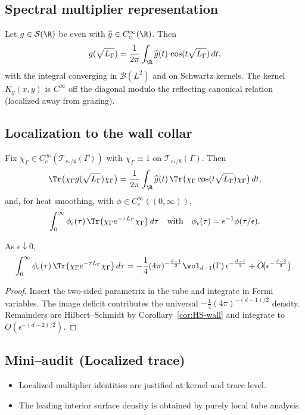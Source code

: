 \subsection{Spectral multiplier representation}
Let $g\in\mathcal S(\R)$ be even with $\widehat g\in C_c^\infty(\R)$. Then
\[
g(\sqrt{L_\Gamma})
=\frac{1}{2\pi}\int_{\R} \widehat g(t)\,\cos(t\sqrt{L_\Gamma})\,dt,
\]
with the integral converging in $\mathcal B(L^2)$ and on Schwartz kernels. The kernel $K_g(x,y)$ is $C^\infty$ off the diagonal modulo the reflecting canonical relation (localized away from grazing).

\subsection{Localization to the wall collar}
Fix $\chi_\Gamma\in C_c^\infty(\mathcal T_{r_*/4}(\Gamma))$ with $\chi_\Gamma\equiv1$ on $\mathcal T_{r_*/8}(\Gamma)$. Then
\[
\Tr\big(\chi_\Gamma g(\sqrt{L_\Gamma})\chi_\Gamma\big)
=\frac{1}{2\pi}\int_{\R}\widehat g(t)\,\Tr\big(\chi_\Gamma \cos(t\sqrt{L_\Gamma})\chi_\Gamma\big)\,dt,
\]
and, for heat smoothing, with $\phi\in C_c^\infty((0,\infty))$,
\[
\int_0^\infty \phi_\epsilon(\tau)\,\Tr\big(\chi_\Gamma e^{-\tau L_\Gamma}\chi_\Gamma\big)\,d\tau
\quad \text{with}\quad \phi_\epsilon(\tau)=\epsilon^{-1}\phi(\tau/\epsilon).
\]

\begin{proposition}
\label{prop:abelian-collar-strong}
As $\epsilon\downarrow0$,
\[
\int_0^\infty \phi_\epsilon(\tau)\,\Tr\big(\chi_\Gamma e^{-\tau L_\Gamma}\chi_\Gamma\big)\,d\tau
= -\frac14(4\pi)^{-\frac{d-1}{2}}\vol_{d-1}(\Gamma)\,\epsilon^{-\frac{d-1}{2}}
+O\!\big(\epsilon^{-\frac{d-2}{2}}\big).
\]
\end{proposition}

\begin{proof}
Insert the two-sided parametrix in the tube and integrate in Fermi variables. The image deficit contributes the universal $-\frac14(4\pi)^{-(d-1)/2}$ density. Remainders are Hilbert–Schmidt by Corollary~\ref{cor:HS-wall} and integrate to $O(\epsilon^{-(d-2)/2})$.
\end{proof}

\subsection*{Mini–audit (Localized trace)}
\begin{itemize}
  \item Localized multiplier identities are justified at kernel and trace level.
  \item The leading interior surface density is obtained by purely local tube analysis.
\end{itemize}

